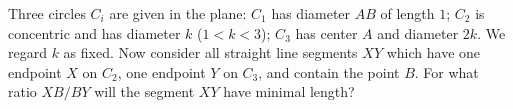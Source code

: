 Three circles $C_i$ are given in the plane: $C_1$ has diameter $AB$ of length $1$; $C_2$ is concentric and has diameter $k$ ($1 < k < 3$); $C_3$ has center $A$ and diameter $2k$.  We regard $k$ as fixed.  Now consider all straight line segments $XY$ which have one endpoint $X$ on $C_2$,  one endpoint $Y$ on $C_3$,  and contain the point $B$.  For what ratio $XB/BY$ will the segment $XY$ have minimal length?